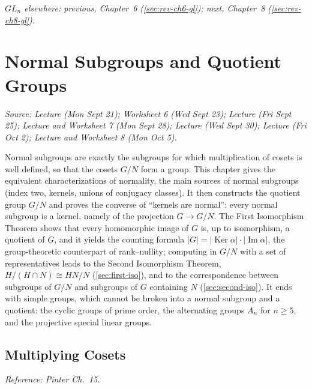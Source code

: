 \documentclass[11pt]{report}
\begin{document}
\textit{$GL_n$ elsewhere: previous, Chapter~6 (\ref{sec:rev-ch6-gl}); next, Chapter~8 (\ref{sec:rev-ch8-gl}).}

\chapter{Normal Subgroups and Quotient Groups}\label{ch:normal}

\textit{Source: Lecture (Mon Sept 21); Worksheet 6 (Wed Sept 23); Lecture (Fri Sept 25); Lecture and Worksheet 7 (Mon Sept 28); Lecture (Wed Sept 30); Lecture (Fri Oct 2); Lecture and Worksheet 8 (Mon Oct 5).}

Normal subgroups are exactly the subgroups for which multiplication of cosets is well defined, so that the cosets $G/N$ form a group. This chapter gives the equivalent characterizations of normality, the main sources of normal subgroups (index two, kernels, unions of conjugacy classes). It then constructs the quotient group $G/N$ and proves the converse of ``kernels are normal'': every normal subgroup is a kernel, namely of the projection $G \to G/N$. The First Isomorphism Theorem shows that every homomorphic image of $G$ is, up to isomorphism, a quotient of $G$, and it yields the counting formula $|G| = |\operatorname{Ker}\alpha| \cdot |\operatorname{Im}\alpha|$, the group-theoretic counterpart of rank--nullity; computing in $G/N$ with a set of representatives leads to the Second Isomorphism Theorem, $H/(H \cap N) \cong HN/N$ (\ref{sec:first-iso}), and to the correspondence between subgroups of $G/N$ and subgroups of $G$ containing $N$ (\ref{sec:second-iso}). It ends with simple groups, which cannot be broken into a normal subgroup and a quotient: the cyclic groups of prime order, the alternating groups $A_n$ for $n \geq 5$, and the projective special linear groups.

\section{Multiplying Cosets}\label{sec:multiplying-cosets}

\textit{Reference: Pinter Ch.\ 15.}
\end{document}
